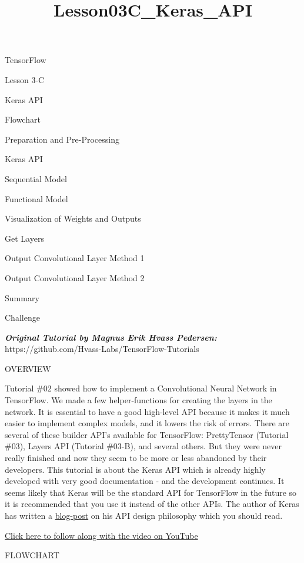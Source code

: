 \documentclass[11pt]{article}
\title{Lesson03C\_Keras\_API}
\begin{document}
    
    
    \maketitle
    
    

    
    TensorFlow

Lesson 3-C

Keras API

Flowchart

Preparation and Pre-Processing

Keras API

Sequential Model

Functional Model

Visualization of Weights and Outputs

Get Layers

Output Convolutional Layer Method 1

Output Convolutional Layer Method 2

Summary

Challenge

\textbf{\emph{Original Tutorial by Magnus Erik Hvass Pedersen:}}
https://github.com/Hvass-Labs/TensorFlow-Tutorials

    OVERVIEW

Tutorial \#02 showed how to implement a Convolutional Neural Network in
TensorFlow. We made a few helper-functions for creating the layers in
the network. It is essential to have a good high-level API because it
makes it much easier to implement complex models, and it lowers the risk
of errors. There are several of these builder API's available for
TensorFlow: PrettyTensor (Tutorial \#03), Layers API (Tutorial \#03-B),
and several others. But they were never really finished and now they
seem to be more or less abandoned by their developers. This tutorial is
about the Keras API which is already highly developed with very good
documentation - and the development continues. It seems likely that
Keras will be the standard API for TensorFlow in the future so it is
recommended that you use it instead of the other APIs. The author of
Keras has written a
\href{https://blog.keras.io/user-experience-design-for-apis.html}{blog-post}
on his API design philosophy which you should read.

\href{https://www.youtube.com/watch?v=3yfRJKA1BiQ\&index=4\&list=PL9Hr9sNUjfsmEu1ZniY0XpHSzl5uihcXZ}{Click
here to follow along with the video on YouTube}

    \hypertarget{Flowchart}{}
FLOWCHART
\end{document}
